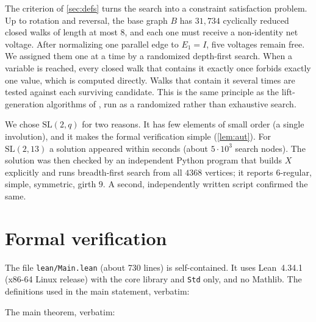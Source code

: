 \documentclass[11pt]{article}
\numberwithin{equation}{section}
\theoremstyle{definition}
\theoremstyle{remark}
\newcommand{\SL}{\mathrm{SL}}
\begin{document}
The criterion of \cref{sec:defs} turns the search into a constraint satisfaction problem. Up to
rotation and reversal, the base graph $B$ has $31{,}734$ cyclically reduced closed walks of length
at most $8$, and each one must receive a non-identity net voltage. After normalizing one parallel
edge to $E_1=I$, five voltages remain free. We assigned them one at a time by a randomized
depth-first search. When a variable is reached, every closed walk that contains it exactly once
forbids exactly one value, which is computed directly. Walks that contain it several times are
tested against each surviving candidate. This is the same principle as the lift-generation
algorithms of \cite{EGJSV}, run as a randomized rather than exhaustive search.

We chose $\SL(2,q)$ for two reasons. It has few elements of small order (a single involution),
and it makes the formal verification simple (\cref{lem:aut}). For $\SL(2,13)$ a solution
appeared within seconds (about $5\cdot10^3$ search nodes). The solution was then checked by an
independent Python program that builds $X$ explicitly and runs breadth-first search from all
$4368$ vertices; it reports $6$-regular, simple, symmetric, girth $9$. A second, independently
written script confirmed the same.

\section{Formal verification}\label{sec:lean}

The file \texttt{lean/Main.lean} (about 730 lines) is self-contained. It uses Lean~4.34.1 \cite{Lean}
(x86-64 Linux release) with the core library and \texttt{Std} only, and no
Mathlib. The definitions used in the main statement, verbatim:



\noindent The main theorem, verbatim:


\end{document}
